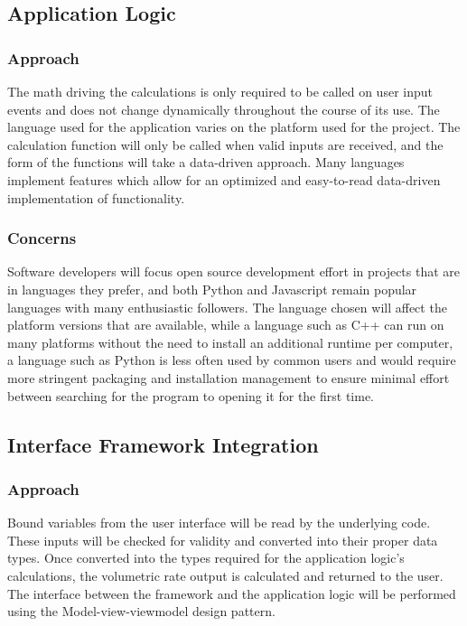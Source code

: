 \documentclass[onecolumn, draftclsnofoot,10pt, compsoc]{IEEEtran}
\begin{document}
\subsection{Application Logic}
\subsubsection{Approach}
The math driving the calculations is only required to be called on user input events and does not change dynamically throughout the course of its use.
The language used for the application varies on the platform used for the project.
The calculation function will only be called when valid inputs are received, and the form of the functions will take a data-driven approach.
Many languages implement features which allow for an optimized and easy-to-read data-driven implementation of functionality.

\subsubsection{Concerns}
Software developers will focus open source development effort in projects that are in languages they prefer, and both Python and Javascript remain popular languages with many enthusiastic followers.
The language chosen will affect the platform versions that are available, while a language such as C++ can run on many platforms without the need to install an additional runtime per computer, a language such as Python is less often used by common users and would require more stringent packaging and installation management to ensure minimal effort between searching for the program to opening it for the first time.

\subsection{Interface Framework Integration}
\subsubsection{Approach}
Bound variables from the user interface will be read by the underlying code.
These inputs will be checked for validity and converted into their proper data types.
Once converted into the types required for the application logic's calculations, the volumetric rate output is calculated and returned to the user.
The interface between the framework and the application logic will be performed using the Model-view-viewmodel design pattern.
\end{document}
